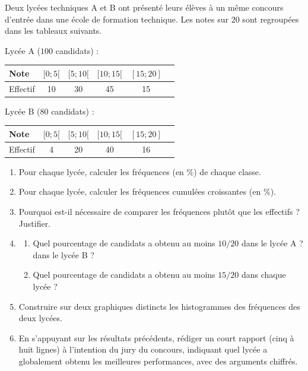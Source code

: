 \documentclass[11pt]{article}
\begin{document}
\begin{exercice}
Deux lycées techniques A et B ont présenté leurs élèves à un même concours d'entrée dans une école de formation technique. Les notes sur $20$ sont regroupées dans les tableaux suivants.

Lycée A ($100$ candidats) :
\begin{center}
\begin{tabular}{|l|c|c|c|c|c|}
\hline
Note & $[0 ; 5[$ & $[5 ; 10[$ & $[10 ; 15[$ & $[15 ; 20]$ \\
\hline
Effectif & 10 & 30 & 45 & 15 \\
\hline
\end{tabular}
\end{center}

Lycée B ($80$ candidats) :
\begin{center}
\begin{tabular}{|l|c|c|c|c|c|}
\hline
Note & $[0 ; 5[$ & $[5 ; 10[$ & $[10 ; 15[$ & $[15 ; 20]$ \\
\hline
Effectif & 4 & 20 & 40 & 16 \\
\hline
\end{tabular}
\end{center}
\begin{enumerate}
\item Pour chaque lycée, calculer les fréquences (en $\%$) de chaque classe.
\item Pour chaque lycée, calculer les fréquences cumulées croissantes (en $\%$).
\item Pourquoi est-il nécessaire de comparer les fréquences plutôt que les effectifs ? Justifier.
\item \begin{enumerate}
\item Quel pourcentage de candidats a obtenu au moins $10/20$ dans le lycée A ? dans le lycée B ?
\item Quel pourcentage de candidats a obtenu au moins $15/20$ dans chaque lycée ?
\end{enumerate}
\item Construire sur deux graphiques distincts les histogrammes des fréquences des deux lycées.
\item En s'appuyant sur les résultats précédents, rédiger un court rapport (cinq à huit lignes) à l'intention du jury du concours, indiquant quel lycée a globalement obtenu les meilleures performances, avec des arguments chiffrés.
\end{enumerate}
\end{exercice}
\end{document}

